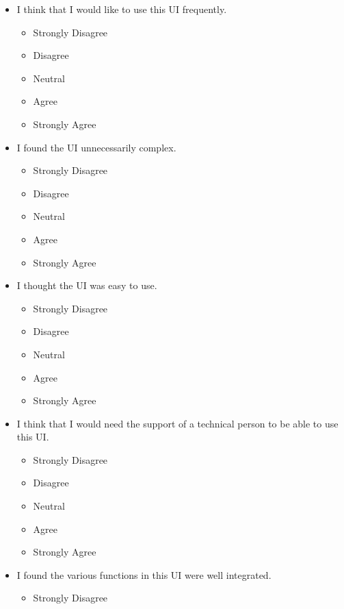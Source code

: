 \documentclass[doublespace,draft,nopageskip]{VTthesis} %
\begin{document}
\begin{itemize}
\begin{itemize}
        \item I think that I would like to use this UI frequently.
            \begin{itemize}
                \item Strongly Disagree
                \item Disagree
                \item Neutral
                \item Agree
                \item Strongly Agree
            \end{itemize}
	\item I found the UI unnecessarily complex.
            \begin{itemize}
                \item Strongly Disagree
                \item Disagree
                \item Neutral
                \item Agree
                \item Strongly Agree
            \end{itemize}
	\item I thought the UI was easy to use.
            \begin{itemize}
                \item Strongly Disagree
                \item Disagree
                \item Neutral
                \item Agree
                \item Strongly Agree
            \end{itemize}
        \item I think that I would need the support of a technical person to be able to use this UI.
            \begin{itemize}
                \item Strongly Disagree
                \item Disagree
                \item Neutral
                \item Agree
                \item Strongly Agree
            \end{itemize}
        \item I found the various functions in this UI were well integrated.
            \begin{itemize}
                \item Strongly Disagree

\end{itemize}
\end{itemize}
\end{itemize}
\end{document}
